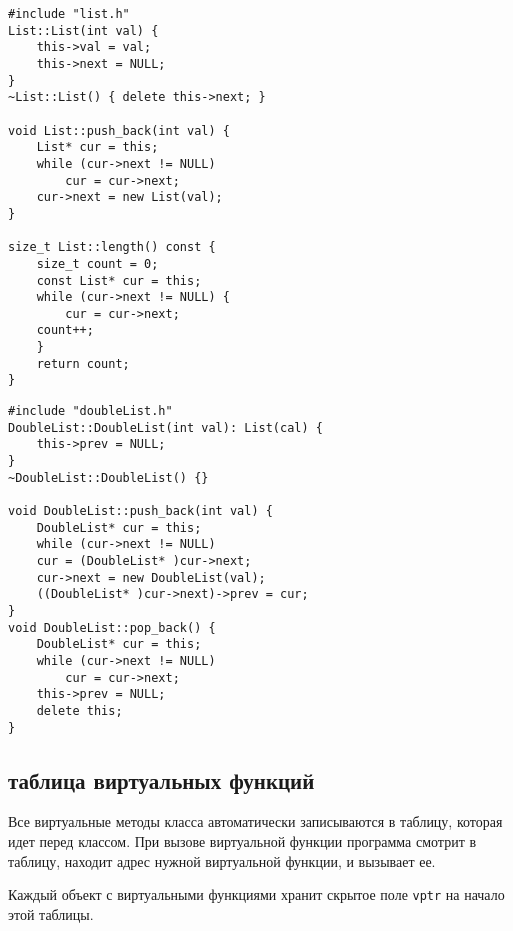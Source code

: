 \begin{minipage}{0.4\textwidth}
\begin{verbatim}
#include "list.h"
List::List(int val) {
    this->val = val;
    this->next = NULL;
}
~List::List() { delete this->next; }

void List::push_back(int val) {
    List* cur = this;
    while (cur->next != NULL) 
        cur = cur->next;
    cur->next = new List(val);
}

size_t List::length() const {
    size_t count = 0;
    const List* cur = this;
    while (cur->next != NULL) {
        cur = cur->next;
	count++;
    }
    return count;
}
\end{verbatim}
\end{minipage}
\hfill
\begin{minipage}{0.5\textwidth}
\begin{verbatim}
#include "doubleList.h"
DoubleList::DoubleList(int val): List(cal) {
    this->prev = NULL;
}
~DoubleList::DoubleList() {}

void DoubleList::push_back(int val) {
    DoubleList* cur = this;
    while (cur->next != NULL)
	cur = (DoubleList* )cur->next;
    cur->next = new DoubleList(val);
    ((DoubleList* )cur->next)->prev = cur;
}
void DoubleList::pop_back() {
    DoubleList* cur = this;
    while (cur->next != NULL)
        cur = cur->next;
    this->prev = NULL;
    delete this;
}
\end{verbatim}
\end{minipage}
\subsection{таблица виртуальных функций}
Все виртуальные методы класса автоматически записываются в таблицу, которая идет перед классом. При вызове виртуальной функции программа смотрит в таблицу, находит адрес нужной виртуальной функции, и вызывает ее.

Каждый объект с виртуальными функциями хранит скрытое поле {\tt vptr} на начало этой таблицы.
